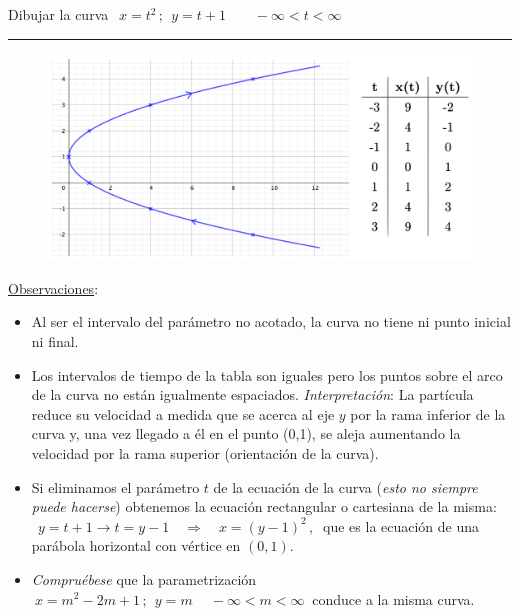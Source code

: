 \vspace{5mm}
\begin{miejercicio}
	
Dibujar la curva $\ \ x=t^2\, ; \ \ y=t+1 \qquad -\infty<t<\infty$

\rule{300pt}{0.2pt}
	
	\begin{figure}[H]
	\centering
	\includegraphics[width=.6\textwidth]{img-polares/polares02.png}
	\end{figure}
\end{miejercicio}

\underline{Observaciones}:
\begin{itemize}
\item Al ser el intervalo del parámetro no acotado, la curva no tiene ni punto inicial ni final. 
\item Los intervalos de tiempo de la tabla son iguales pero los puntos sobre el arco de la curva no están igualmente espaciados. \hspace{3mm} \emph{Interpretación}: La partícula reduce su velocidad a medida que se acerca al eje $y$ por la rama inferior de la curva y, una vez llegado a él en el punto (0,1), se aleja	 aumentando la velocidad por la rama superior (orientación de la curva).
\item Si eliminamos el parámetro $t$ de la ecuación de la curva (\emph{esto no siempre puede hacerse}) obtenemos la ecuación rectangular o cartesiana de la misma: 
$\ \ y=t+1 \to t=y-1 \quad\Rightarrow \quad x=(y-1)^2 \, , \ $ que es la ecuación de una parábola horizontal con vértice en $(0,1)$.

\item \emph{Compruébese} que la parametrización $\ x=m^2-2m+1\, ; \ \ y=m\ \quad -\infty<m<\infty\ $ conduce a la misma curva.
\end{itemize}



\vspace{5mm}


